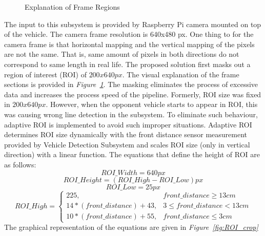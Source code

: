 \documentclass[a4paper,12pt]{article}
\begin{document}
\begin{enumerate}[A.]
\begin{figure}[t]
	\caption{Explanation of Frame Regions}\label{fig:explanation_ROI_ROT}
	
\end{figure}

The input to this subsystem is provided by Raspberry Pi camera mounted on top of the vehicle. The camera frame resolution is 640x480 px. One thing to for the camera frame is that horizontal mapping and the vertical mapping of the pixels are not the same. That is, same amount of pixels in both directions do not correspond to same length in real life. The proposed solution first masks out a region of interest (ROI) of $200x640 px$. The visual explanation of the frame sections is provided in \textit{Figure~\ref{fig:explanation_ROI_ROT}}. The masking eliminates the process of excessive data and increases the process speed of the pipeline. Formerly, ROI size was fixed in $200x640 px$. However, when the opponent vehicle starts to appear in ROI, this was causing wrong line detection in the subsystem. To eliminate such behaviour, adaptive ROI is implemented to avoid such improper situations. Adaptive ROI determines ROI size dynamically with the front distance sensor measurement provided by Vehicle Detection Subsystem and scales ROI size (only in vertical direction) with a linear function. The equations that define the height of ROI are as follows:
\begin{equation}
	ROI\_Width = 640 px
\end{equation}
\begin{equation}
	ROI\_Height = (ROI\_High - ROI\_Low) px
\end{equation}
\begin{equation}
	ROI\_Low = 25 px
\end{equation}
\begin{equation}
	ROI\_High =
		\begin{cases}
		225, & front\_distance \geq 13 cm \\
		14*(front\_distance) + 43, &3\leq front\_distance <  13 cm \\
		10*(front\_distance) + 55, & front\_distance \leq 3 cm
		\end{cases}
\end{equation}
The graphical representation of the equations are given in \textit{Figure~\ref{fig:ROI_crop}}


\begin{figure}[t!]
	
	\setlength{\unitlength}{\textwidth} 
	
	\centering
	

\end{figure}
\end{enumerate}
\end{document}
